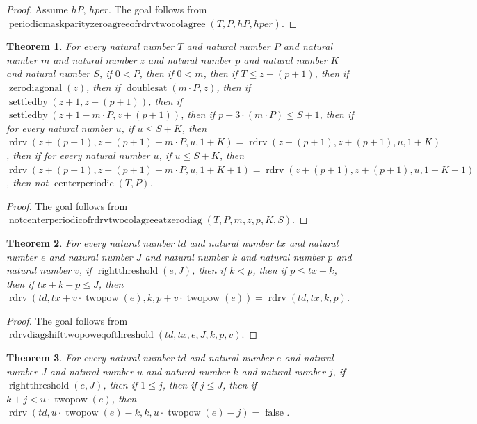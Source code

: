 \documentclass[11pt]{article}
\newtheorem{theorem}{Theorem}[section]
\theoremstyle{definition}
\begin{document}
\begin{proof}
Assume \(hP\), \(hper\).
The goal follows from \(\operatorname{periodicmaskparityzeroagreeofrdrvtwocolagree}(T, P, hP, hper)\).
\end{proof}
\begin{theorem}
\label{ll:paper:not-centerperiodic-of-rdrv-two-col-agree-at-zero-diag}
For every natural number \(T\) and natural number \(P\) and natural number \(m\) and natural number \(z\) and natural number \(p\) and natural number \(K\) and natural number \(S\), if \(0 < P\), then if \(0 < m\), then if \(T \le z + (p + 1)\), then if \(\operatorname{zerodiagonal}(z)\), then if \(\operatorname{doublesat}(m \cdot P, z)\), then if \(\operatorname{settledby}(z + 1, z + (p + 1))\), then if \(\operatorname{settledby}(z + 1 - m \cdot P, z + (p + 1))\), then if \(p + 3 \cdot (m \cdot P) \le S + 1\), then if for every natural number \(u\), if \(u \le S + K\), then \(\operatorname{rdrv}(z + (p + 1), z + (p + 1) + m \cdot P, u, 1 + K) = \operatorname{rdrv}(z + (p + 1), z + (p + 1), u, 1 + K)\), then if for every natural number \(u\), if \(u \le S + K\), then \(\operatorname{rdrv}(z + (p + 1), z + (p + 1) + m \cdot P, u, 1 + K + 1) = \operatorname{rdrv}(z + (p + 1), z + (p + 1), u, 1 + K + 1)\), then not \(\operatorname{centerperiodic}(T, P)\).
\end{theorem}
\begin{proof}
The goal follows from \(\operatorname{notcenterperiodicofrdrvtwocolagreeatzerodiag}(T, P, m, z, p, K, S)\).
\end{proof}
\begin{theorem}
\label{ll:paper:rdrv-diag-shift-twopow-eq-of-threshold}
For every natural number \(td\) and natural number \(tx\) and natural number \(e\) and natural number \(J\) and natural number \(k\) and natural number \(p\) and natural number \(v\), if \(\operatorname{rightthreshold}(e, J)\), then if \(k < p\), then if \(p \le tx + k\), then if \(tx + k - p \le J\), then \(\operatorname{rdrv}(td, tx + v \cdot \operatorname{twopow}(e), k, p + v \cdot \operatorname{twopow}(e)) = \operatorname{rdrv}(td, tx, k, p)\).
\end{theorem}
\begin{proof}
The goal follows from \(\operatorname{rdrvdiagshifttwopoweqofthreshold}(td, tx, e, J, k, p, v)\).
\end{proof}
\begin{theorem}
\label{ll:paper:rdrv-zero-gap-of-threshold}
For every natural number \(td\) and natural number \(e\) and natural number \(J\) and natural number \(u\) and natural number \(k\) and natural number \(j\), if \(\operatorname{rightthreshold}(e, J)\), then if \(1 \le j\), then if \(j \le J\), then if \(k + j < u \cdot \operatorname{twopow}(e)\), then \(\operatorname{rdrv}(td, u \cdot \operatorname{twopow}(e) - k, k, u \cdot \operatorname{twopow}(e) - j) = \operatorname{false}\).
\end{theorem}
\end{document}
